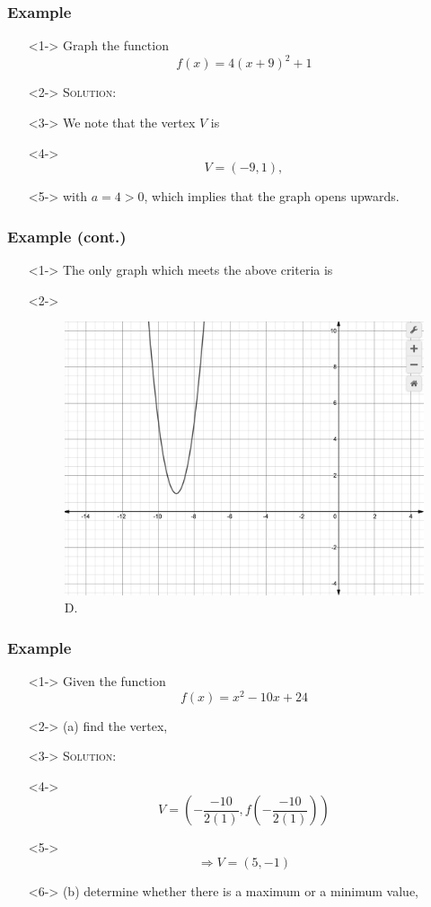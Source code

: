\documentclass[handout]{beamer}
\begin{document}
\begin{frame}
	\frametitle{Example}
	\begin{enumerate}
		\item[]<1-> Graph the function
		\[
			f(x)=4(x+9)^{2}+1
		\]
		\item[]<2-> \textsc{Solution:}
		\item[]<3-> We note that the vertex $V$ is
		\item[]<4-> \[ V=(-9, 1), \]
		\item[]<5-> with $a=4>0$, which implies that the graph opens upwards.
	\end{enumerate}
\end{frame}

\begin{frame}
	\frametitle{Example (cont.)}
	\begin{enumerate}
		\item[]<1-> The only graph which meets the above criteria is
		\item[]<2->
		\begin{figure}
			\begin{center}
				\caption{D.}
				\includegraphics[scale=0.2]{3_3_9.png}
			\end{center}
		\end{figure}
	\end{enumerate}
\end{frame}

\begin{frame}
	\frametitle{Example}
	\begin{enumerate}
		\item[]<1-> Given the function
		\[
			f(x)=x^{2}-10x+24
		\]
		\item[]<2-> (a) find the vertex,
		\item[]<3-> \textsc{Solution:}
		\item[]<4-> \[ V= \left(-\frac{-10}{2(1)}, f \left(-\frac{-10}{2(1)} \right) \right) \]
		\item[]<5-> \[ \Rightarrow V=\left( 5, -1 \right) \]
		\item[]<6-> (b) determine whether there is a maximum or a minimum value,
	\end{enumerate}
\end{frame}
\end{document}
